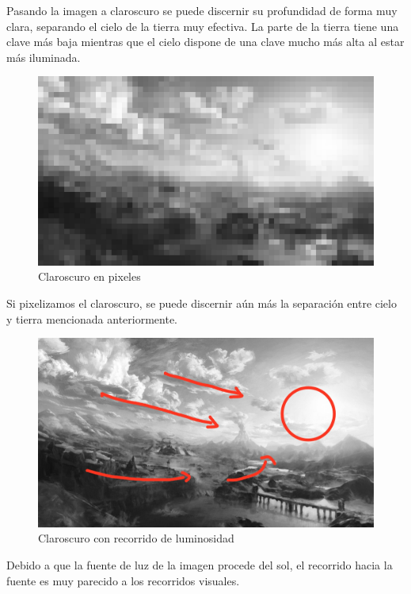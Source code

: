 \documentclass[12pt]{article}
\begin{document}
          Pasando la imagen a claroscuro se puede discernir su profundidad de forma muy clara, separando el cielo de la tierra muy efectiva. 
          La parte de la tierra tiene una clave más baja mientras que el cielo dispone de una clave mucho más alta al estar más iluminada. 
          \newpage
          \begin{figure}[H]
            \centering
            \includegraphics[width=\textwidth]{Jesus/Seccion2/pixel.jpg}
            \caption{Claroscuro en pixeles}
          \end{figure}
          Si pixelizamos el claroscuro, se puede discernir aún más la separación entre cielo y tierra mencionada anteriormente. 
          \newpage
          \begin{figure}[H]
            \centering
            \includegraphics[width=\textwidth]{Jesus/Seccion2/Clarocuro con recorridos.jpg}
            \caption{Claroscuro con recorrido de luminosidad}
          \end{figure}
          Debido a que la fuente de luz de la imagen procede del sol, el recorrido hacia la fuente es muy parecido a los recorridos visuales. 
          \newpage
\end{document}
